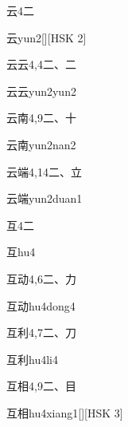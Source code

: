 \begin{entry}{云}{4}{⼆}
  \begin{phonetics}{云}{yun2}[][HSK 2]
  \end{phonetics}
\end{entry}

\begin{entry}{云云}{4,4}{⼆、⼆}
  \begin{phonetics}{云云}{yun2yun2}
  \end{phonetics}
\end{entry}

\begin{entry}{云南}{4,9}{⼆、⼗}
  \begin{phonetics}{云南}{yun2nan2}
  \end{phonetics}
\end{entry}

\begin{entry}{云端}{4,14}{⼆、⽴}
  \begin{phonetics}{云端}{yun2duan1}
  \end{phonetics}
\end{entry}

\begin{entry}{互}{4}{⼆}
  \begin{phonetics}{互}{hu4}
  \end{phonetics}
\end{entry}

\begin{entry}{互动}{4,6}{⼆、⼒}
  \begin{phonetics}{互动}{hu4dong4}
  \end{phonetics}
\end{entry}

\begin{entry}{互利}{4,7}{⼆、⼑}
  \begin{phonetics}{互利}{hu4li4}
  \end{phonetics}
\end{entry}

\begin{entry}{互相}{4,9}{⼆、⽬}
  \begin{phonetics}{互相}{hu4xiang1}[][HSK 3]
  \end{phonetics}
\end{entry}

